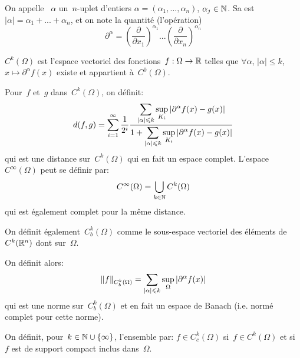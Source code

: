 \medskip
\begin{definition}
On appelle ~$\alpha$ un~$n$-uplet d'entiers
$\alpha=(\alpha_1, ..., \alpha_n)$, $\alpha_j\in\mathbb N$.
Sa  est~$|\alpha|=\alpha_1+ ... + \alpha_n$,
et on note  la quantité (l'opération)
\begin{equation}\partial^\alpha=\left(\dfrac{\partial}{\partial x_1}\right)^{\alpha_1}...\left(\dfrac{\partial}{\partial x_n}\right)^{\alpha_n}\end{equation}
\end{definition}

\medskip{}
$C^k(\Omega)$ est l'espace vectoriel des fonctions~$f: \Omega \to \mathbb R$ telles que
$\forall \alpha$, $|\alpha|\le k$, $x\mapsto \partial^\alpha f(x)$ existe et appartient
à~$C^0(\Omega)$.

Pour~$f$ et~$g$ dans~$C^k(\Omega)$, on définit:
\begin{equation}
d(f,g)=\dsum_{i=1}^\infty \dfrac1{2^i}\dfrac{\dsum_{|\alpha|\le k} \sup_{K_i}|\partial^\alpha f(x)-g(x)|}{%
1+\dsum_{|\alpha|\le k} \sup_{K_i}|\partial^\alpha f(x)-g(x)|}
\end{equation}
qui est une distance sur~$C^k(\Omega)$ qui en fait un espace complet. L'espace~$C^\infty(\Omega)$ peut se définir par: \begin{equation} C^\infty(\Omega)=\bigcup\limits_{k\in\mathbb N}C^k(\Omega)\end{equation}
qui est également complet pour la même distance.

\bigskip{}
On définit également~$C^k_b(\Omega)$ comme le sous-espace vectoriel des éléments
de~$C^k(\mathbb R^n)$ dont 
sur~$\Omega$.

On définit alors:
\begin{equation}
\|f\|_{C^k_b(\Omega)}=\displaystyle\sum_{|\alpha|\leqslant k} \sup_{\Omega} |\partial^\alpha f(x)|
\end{equation}
qui est une norme sur~$C^k_b(\Omega)$ et en fait un espace de Banach (i.e. normé
complet pour cette norme).

\medskip
\begin{definition}\label{Def-Cc}
On définit, pour~$k\in\mathbb N\cup\{\infty\}$, l'ensemble  par:
$f\in C_c^k(\Omega)$ si~$f\in C^k(\Omega)$ et si~$f$ est de support compact inclus dans~$\Omega$.
\end{definition}

